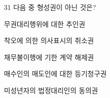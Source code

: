 \begin{question}{31}
다음 중 형성권이 아닌 것은?
\begin{choices}
  \item 무권대리행위에 대한 추인권
  \item 착오에 의한 의사표시의 취소권
  \item 채무불이행에 기한 계약 해제권
  \item 매수인의 매도인에 대한 등기청구권
  \item 미성년자의 법정대리인의 동의권
\end{choices}
\end{question}
